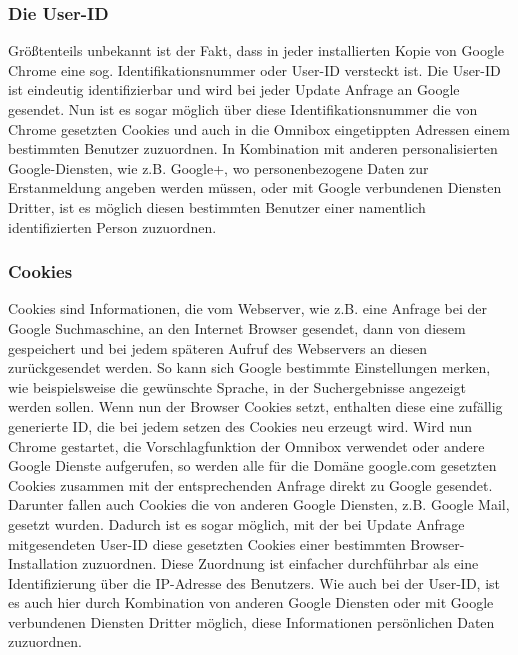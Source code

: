 \documentclass[12pt, a4paper]{llncs}
\begin{document}
	\subsubsection{Die User-ID}
	\label{User-ID}
	Größtenteils unbekannt ist der Fakt, dass in jeder installierten Kopie von Google Chrome eine sog. Identifikationsnummer oder User-ID versteckt ist. Die User-ID ist eindeutig identifizierbar und wird bei jeder Update Anfrage an Google gesendet. Nun ist es sogar möglich über diese Identifikationsnummer die von Chrome gesetzten Cookies und auch in die Omnibox eingetippten Adressen einem bestimmten Benutzer zuzuordnen. In Kombination mit anderen personalisierten Google-Diensten, wie z.B. Google+, wo personenbezogene Daten zur Erstanmeldung angeben werden müssen, oder mit Google verbundenen Diensten Dritter, ist es möglich diesen bestimmten Benutzer einer namentlich identifizierten Person zuzuordnen\cite{2}.
	
	\subsubsection{Cookies}
	Cookies sind Informationen, die vom Webserver, wie z.B. eine Anfrage bei der Google Suchmaschine, an den Internet Browser gesendet, dann von diesem gespeichert und bei jedem späteren Aufruf des Webservers an diesen zurückgesendet werden. So kann sich Google bestimmte Einstellungen merken, wie beispielsweise die gewünschte Sprache, in der Suchergebnisse angezeigt werden sollen. Wenn nun der Browser Cookies setzt, enthalten diese eine zufällig generierte ID, die bei jedem setzen des Cookies neu erzeugt wird. Wird nun Chrome gestartet, die Vorschlagfunktion der Omnibox verwendet oder andere Google Dienste aufgerufen, so werden alle für die Domäne google.com gesetzten Cookies zusammen mit der entsprechenden Anfrage direkt zu Google gesendet. Darunter fallen auch Cookies die von anderen Google Diensten, z.B. Google Mail, gesetzt wurden. Dadurch ist es sogar möglich, mit der bei Update Anfrage mitgesendeten User-ID diese gesetzten Cookies einer bestimmten Browser-Installation zuzuordnen. Diese Zuordnung ist einfacher durchführbar als eine Identifizierung über die IP-Adresse des Benutzers. Wie auch bei der User-ID, ist es auch hier durch Kombination von anderen Google Diensten oder mit Google verbundenen Diensten Dritter möglich, diese Informationen persönlichen Daten zuzuordnen\cite{2}.
	
\end{document}
